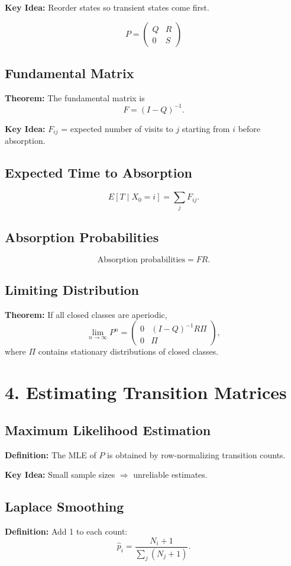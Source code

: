 \documentclass[11pt]{article}
\newcommand{\defn}[1]{\textcolor{mygreen}{\textbf{Definition:} #1}}
\newcommand{\thm}[1]{\textcolor{mygreen}{\textbf{Theorem:} #1}}
\newcommand{\idea}[1]{\textcolor{mygreen}{\textbf{Key Idea:} #1}}
\begin{document}
\idea{Reorder states so transient states come first.}

\[
P =
\begin{pmatrix}
Q & R\\
0 & S
\end{pmatrix}
\]

\subsection*{Fundamental Matrix}
\thm{The fundamental matrix is
\[
F = (I-Q)^{-1}.
\]}

\idea{$F_{ij}$ = expected number of visits to $j$ starting from $i$ before absorption.}

\subsection*{Expected Time to Absorption}
\[
E[T \mid X_0=i] = \sum_j F_{ij}.
\]

\subsection*{Absorption Probabilities}
\[
\text{Absorption probabilities} = FR.
\]

\subsection*{Limiting Distribution}
\thm{If all closed classes are aperiodic,
\[
\lim_{n\to\infty} P^n =
\begin{pmatrix}
0 & (I-Q)^{-1} R \Pi\\
0 & \Pi
\end{pmatrix},
\]
where $\Pi$ contains stationary distributions of closed classes.}

\section*{4. Estimating Transition Matrices}

\subsection*{Maximum Likelihood Estimation}
\defn{The MLE of $P$ is obtained by row-normalizing transition counts.}

\idea{Small sample sizes $\Rightarrow$ unreliable estimates.}

\subsection*{Laplace Smoothing}
\defn{Add 1 to each count:
\[
\hat p_i = \frac{N_i + 1}{\sum_j (N_j + 1)}.
\]}
\end{document}
